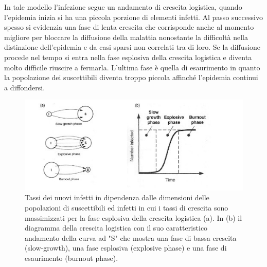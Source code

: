 In tale modello l'infezione segue un andamento di crescita logistica, quando l'epidemia inizia si ha una piccola porzione di elementi infetti. Al passo successivo spesso si evidenzia una fase di lenta crescita che corrisponde anche al momento migliore per bloccare la diffusione della malattia nonostante la difficoltà nella distinzione dell'epidemia e da casi sparsi non correlati tra di loro. Se la diffusione procede nel tempo si entra nella fase esplosiva della crescita logistica e diventa molto difficile riuscire a fermarla. L'ultima fase è quella di esaurimento in quanto la popolazione dei suscettibili diventa troppo piccola affinché l'epidemia continui a diffondersi.

\begin{figure}[H]
    \centering
    \includegraphics[width=.7\textwidth]{resources/tasso_sir_2.jpeg}
    \caption{Tassi dei nuovi infetti in dipendenza dalle dimensioni delle popolazioni di suscettibili ed infetti in cui i tassi di crescita sono massimizzati per la fase esplosiva della crescita logistica (a). In (b) il diagramma della crescita logistica con il suo caratteristico andamento della curva ad "S" che mostra una fase di bassa crescita (slow-growth), una fase esplosiva (explosive phase) e una fase di esaurimento (burnout phase).} 
\end{figure}

